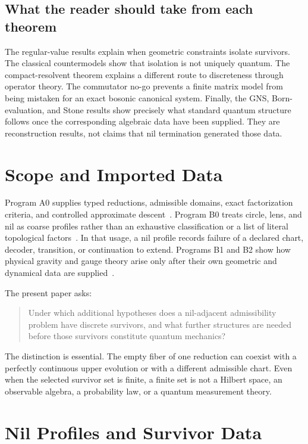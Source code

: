 \documentclass[11pt]{article}
\begin{document}
\subsection{What the reader should take from each theorem}

The regular-value results explain when geometric constraints isolate
survivors.  The classical countermodels show that isolation is not uniquely
quantum.  The compact-resolvent theorem explains a different route to
discreteness through operator theory.  The commutator no-go prevents a finite
matrix model from being mistaken for an exact bosonic canonical system.
Finally, the GNS, Born-evaluation, and Stone results show precisely what
standard quantum structure follows once the corresponding algebraic data have
been supplied.  They are reconstruction results, not claims that nil
termination generated those data.

\section{Scope and Imported Data}

Program A0 supplies typed reductions, admissible domains, exact factorization
criteria, and controlled approximate descent~\cite{A0}.  Program B0 treats
circle, lens, and nil as coarse profiles rather than an exhaustive
classification or a list of literal topological factors~\cite{B0}.  In that
usage, a nil profile records failure of a declared chart, decoder, transition,
or continuation to extend.  Programs B1 and B2 show how physical gravity and
gauge theory arise only after their own geometric and dynamical data are
supplied~\cite{B1,B2}.

The present paper asks:
\begin{quote}
Under which additional hypotheses does a nil-adjacent admissibility problem
have discrete survivors, and what further structures are needed before those
survivors constitute quantum mechanics?
\end{quote}

The distinction is essential.  The empty fiber of one reduction can coexist
with a perfectly continuous upper evolution or with a different admissible
chart.  Even when the selected survivor set is finite, a finite set is not a
Hilbert space, an observable algebra, a probability law, or a quantum
measurement theory.

\section{Nil Profiles and Survivor Data}
\end{document}
